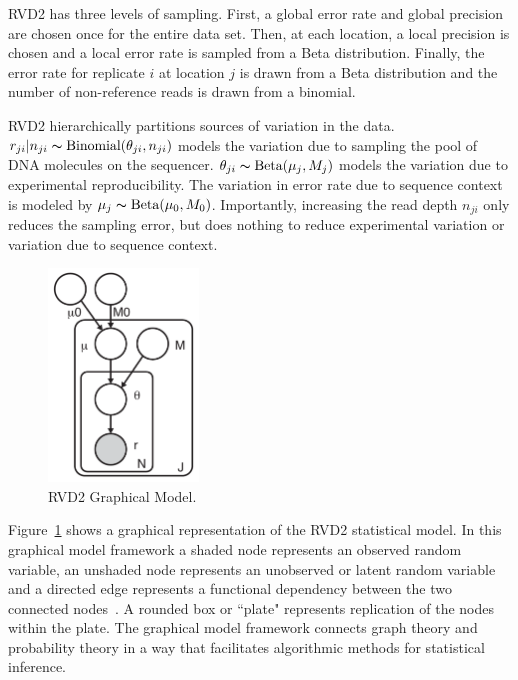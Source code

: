 \documentclass{bioinfo}
\begin{document}
RVD2 has three levels of sampling. First, a global error rate and global precision are chosen once for the entire data set. Then, at each location, a local precision is chosen and a local error rate is sampled from a Beta distribution. Finally, the error rate for replicate $i$ at location $j$ is drawn from a Beta distribution and the number of non-reference reads is drawn from a binomial.

RVD2 hierarchically partitions sources of variation in the data. $r_{ji} | n_{ji} \thicksim \text{Binomial}(\theta_{ji}, n_{ji})$ models the variation due to sampling the pool of DNA molecules on the sequencer. $\theta_{ji} \thicksim \text{Beta}(\mu_j, M_j)$ models the variation due to experimental reproducibility. The variation in error rate due to sequence context is modeled by $\mu_j \thicksim \text{Beta}(\mu_0, M_0)$. Importantly, increasing the read depth $n_{ji}$ only reduces the sampling error, but does nothing to reduce experimental variation or variation due to sequence context.

\begin{figure}[!bpth]
\begin{center}
\includegraphics[width=40mm]{pdf_figs/RVD2_model.pdf}
\caption{RVD2 Graphical Model.}
\label{fig:graphical_model}
\end{center}
\end{figure}

Figure~\ref{fig:graphical_model} shows a graphical representation of the RVD2 statistical model. In this graphical model framework a shaded node represents an observed random variable, an unshaded node represents an unobserved or latent random variable and a directed edge represents a functional dependency between the two connected nodes~\citep{jordan2004graphical}. A rounded box or ``plate" represents replication of the nodes within the plate. The graphical model framework connects graph theory and probability theory in a way that facilitates algorithmic methods for statistical inference.
\end{document}
